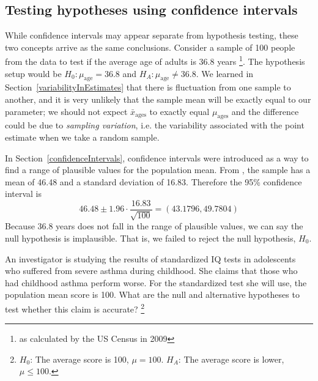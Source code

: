 \subsection{Testing hypotheses using confidence intervals}
\label{utilizingOurCI}

While confidence intervals may appear separate from hypothesis testing, these two concepts arrive as the same conclusions. Consider a sample of 100 people from the  data to test if the average age of adults is 36.8 years \footnote{as calculated by the US Census in 2009}. The hypothesis setup would be $H_0: \mu_{\mathrm{age}}=36.8$ and $H_A: \mu_{\mathrm{age}} \neq 36.8$. We learned in Section~\ref{variabilityInEstimates} that there is fluctuation from one sample to another, and it is very unlikely that the sample mean will be exactly equal to our parameter; we should not expect $\bar{x}_{\mathrm{ages}}$ to exactly equal $\mu_{\mathrm{ages}}$ and the difference could be due to \emph{sampling variation}, i.e. the variability associated with the point estimate when we take a random sample.

In Section~\ref{confidenceIntervals}, confidence intervals were introduced as a way to find a range of plausible values for the population mean. From , the sample has a mean of 46.48 and a standard deviation of 16.83. Therefore the 95\% confidence interval is \[46.48 \pm 1.96 \cdot \frac{16.83}{\sqrt{100}} = (43.1796, 49.7804)\] Because 36.8 years does not fall in the range of plausible values, we can say the null hypothesis is implausible. That is, we failed to reject the null hypothesis, $H_0$. 

\begin{exercise} \label{htForHousingExpenseForCommunityCollege650}
An investigator is studying the results of standardized IQ tests in adolescents who suffered from severe asthma during childhood. She claims that those who had childhood asthma perform worse. For the standardized test she will use, the population mean score is 100. What are the null and alternative hypotheses to test whether this claim is accurate? \footnote{$H_0$: The average score is 100, $\mu = 100$. \hspace{3.4mm} $H_A$: The average score is lower, $\mu \leq 100$.}
\end{exercise}

